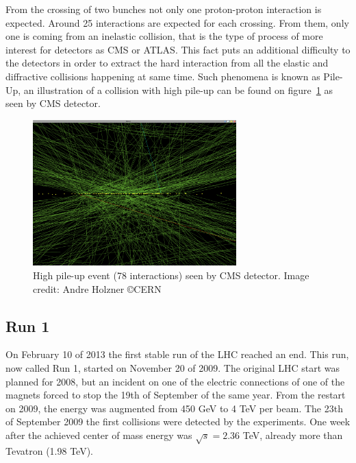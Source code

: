 From the crossing of two bunches not only one proton-proton interaction is expected. Around 25 interactions are expected for each crossing. From them, only one is coming from an inelastic collision, that is the type of process of more interest for detectors as CMS or ATLAS. This fact puts an additional difficulty to the detectors in order to extract the hard interaction from all the elastic and diffractive collisions happening at same time. Such phenomena is known as Pile-Up, an illustration of a collision with high pile-up can be found on figure~\ref{fig:pileup} as seen by CMS detector.

\begin{figure}[!Hhtbp]
  \begin{center}
    \includegraphics[width=0.7\textwidth]{figs/pileup.png}
    \caption{High pile-up event (78 interactions) seen by CMS detector. Image credit: Andre Holzner \copyright CERN}
    \label{fig:pileup}
  \end{center}
\end{figure}

\subsection{Run 1}
\label{sec:run1}

On February 10 of 2013 the first stable run of the LHC reached an end. This run, now called Run 1, started on November 20 of 2009. The original LHC start was planned for 2008, but an incident on one of the electric connections of one of the magnets forced to stop the 19th of September of the same year. From the restart on 2009, the energy was augmented from 450 GeV to 4 TeV per beam. The 23th of September 2009 the first collisions were detected by the experiments. One week after the achieved center of mass energy was $\sqrt{s}=2.36$ TeV, already more than Tevatron (1.98 TeV). 

